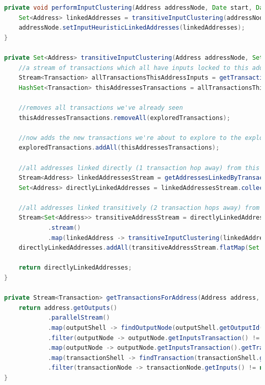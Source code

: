 \begin{lstlisting}[language=Java, caption={Java Implementation of on demand clustering}, label={lst:clustering-on-demand}, breaklines=true, basicstyle=\small]
private void performInputClustering(Address addressNode, Date start, Date end) {
    Set<Address> linkedAddresses = transitiveInputClustering(addressNode, new HashSet<>(), start, end);
    addressNode.setInputHeuristicLinkedAddresses(linkedAddresses);
}

private Set<Address> transitiveInputClustering(Address addressNode, Set<Transaction> exploredTransactions, Date start, Date end) {
    //a stream of transactions which all have inputs locked to this address
    Stream<Transaction> allTransactionsThisAddressInputs = getTransactionsForAddress(addressNode, start, end);
    HashSet<Transaction> thisAddressesTransactions = allTransactionsThisAddressInputs.collect(Collectors.toCollection(HashSet::new));

    //removes all transactions we've already seen
    thisAddressesTransactions.removeAll(exploredTransactions);

    //now adds the new transactions we're about to explore to the explored set
    exploredTransactions.addAll(thisAddressesTransactions);

    //all addresses linked directly (1 transaction hop away) from this address
    Stream<Address> linkedAddressesStream = getAddressesLinkedByTransactions(thisAddressesTransactions.parallelStream(), start, end);
    Set<Address> directlyLinkedAddresses = linkedAddressesStream.collect(Collectors.toSet());

    //all addresses linked transitively (2 transaction hops away) from this address
    Stream<Set<Address>> transitiveAddressStream = directlyLinkedAddresses
            .stream()
            .map(linkedAddress -> transitiveInputClustering(linkedAddress, exploredTransactions, start, end));
    directlyLinkedAddresses.addAll(transitiveAddressStream.flatMap(Set::stream).collect(Collectors.toSet()));

    return directlyLinkedAddresses;
}

private Stream<Transaction> getTransactionsForAddress(Address address, Date start, Date end) {
    return address.getOutputs()
            .parallelStream()
            .map(outputShell -> findOutputNode(outputShell.getOutputId(), start, end))
            .filter(outputNode -> outputNode.getInputsTransaction() != null)
            .map(outputNode -> outputNode.getInputsTransaction().getTransaction())
            .map(transactionShell -> findTransaction(transactionShell.getTransactionId()))
            .filter(transactionNode -> transactionNode.getInputs() != null && transactionNode.getInputs().size() > 1);
}


\end{lstlisting}
